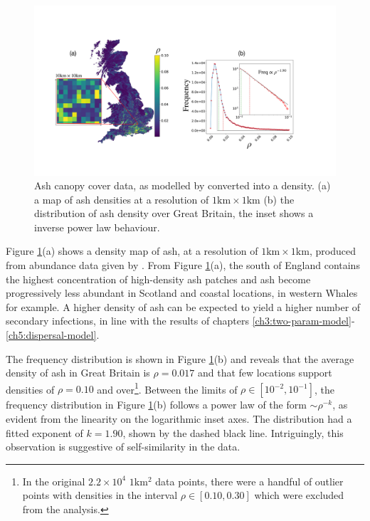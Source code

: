 \begin{figure}
    \centering
    \includegraphics[scale=0.30]{chapter6/figures/fig3-ash-data.pdf}
    \caption{Ash canopy cover data, as modelled by \cite{hill.data} converted into a density. (a) a map of ash densities at a resolution of $1\mathrm{km} \times 1\mathrm{km}$ (b) the distribution of ash density over Great Britain, the inset shows a inverse power law behaviour.}
    \label{fig:ash-host-data}
\end{figure}

Figure \ref{fig:ash-host-data}(a) shows a density map of ash, at a resolution of $\mathrm{1km}\times \mathrm{1km}$, produced from abundance data given by \cite{hill.data}. From Figure \ref{fig:ash-host-data}(a), the south of England contains the highest concentration of high-density ash patches and ash become progressively less abundant in Scotland and coastal locations, in western Whales for example. A higher density of ash can be expected to yield a higher number of secondary infections, in line with the results of chapters \ref{ch3:two-param-model}-\ref{ch5:dispersal-model}.
 
The frequency distribution is shown in Figure \ref{fig:ash-host-data}(b) and reveals that the average density of ash in Great Britain is $\rho=0.017$ and that few locations support densities of $\rho=0.10$ and over\footnote{In the original $2.2\times 10^4$ $1\mathrm{km^2}$ data points, there were a handful of outlier points with densities in the interval $\rho \in [0.10, 0.30]$ which were excluded from the analysis.}. Between the limits of $\rho \in [10^{-2}, 10^{-1}]$, the frequency distribution in Figure \ref{fig:ash-host-data}(b) follows a power law of the form $\sim \rho ^{-k}$, as evident from the linearity on the logarithmic inset axes. The distribution had a fitted exponent of $k=1.90$, shown by the dashed black line. Intriguingly, this observation is suggestive of self-similarity in the data.

